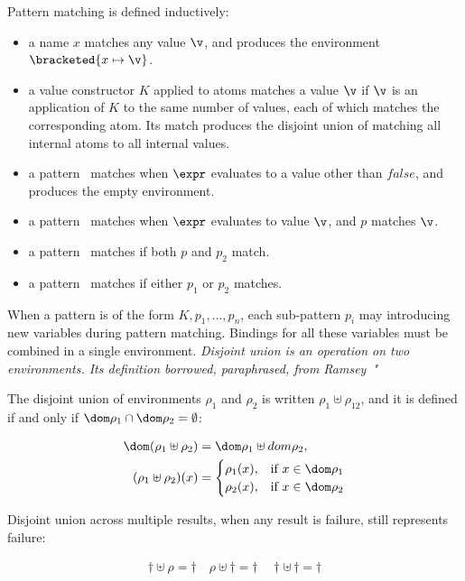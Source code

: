 \documentclass[manuscript,screen,review, 12pt, nonacm]{acmart}
\begin{document}
Pattern matching is defined inductively: 
\begin{itemize}
    \item a name $x$ matches any value $\v$, and produces the environment 
    $\bracketed{x \mapsto \v}$. 
    \item a value constructor $K$ applied to atoms  matches 
    a value $\v$ if $\v$ is an application of $K$ to the same number of values,
    each of which matches the corresponding atom. Its match produces 
    the disjoint union of matching all internal atoms to all internal values. 
    \item a pattern \whenexpr\ matches when $\expr$ evaluates to a value other than 
    $\mathit{false}$, and produces the empty environment. 
    \item a pattern \parrowe\ matches when $\expr$ evaluates to 
          value $\v$, and $p$ matches $\v$. 
    \item a pattern \pcommap\ matches if both $p$ and $p_{2}$ match.
    \item a pattern \porp\ matches if either $p_{1}$ or $p_{2}$
    matches. 
\end{itemize}

When a pattern is of the form $K, p_{1}, \dots, p_{n}$, each sub-pattern $p_{i}$
may introducing new variables during pattern matching. Bindings for all these
variables must be combined in a single environment. \it{Disjoint union} is an
operation on two environments. Its definition borrowed, paraphrased, from Ramsey~\citep{bpc}" 

The disjoint union of environments $\rho_{1}$ and $\rho_{2}$ is written
$\rho_{1} \uplus \rho_{12}$, and it is defined if and only if $\dom \rho_{1}
\cap \dom \rho_{2} = \emptyset$:

\begin{align*}
  \dom(\rho_{1} \uplus \rho_{2}) &= \dom \rho_{1} \uplus dom \rho_{2}, \\
    (\rho_{1} \uplus \rho_{2})(x) &= 
  \begin{cases}
    \rho_{1}(x), & \text{if } x \in \dom  \rho_{1} \\
    \rho_{2}(x), & \text{if } x \in \dom \rho_{2} \\
\end{cases}
\end{align*}

Disjoint union across multiple results, when any result is failure, still
represents failure: 

\begin{gather*}
  \dagger \uplus \rho = \dagger \quad
  \rho \uplus \dagger = \dagger \quad
  \dagger \uplus\, \dagger = \dagger
\end{gather*}
\end{document}
